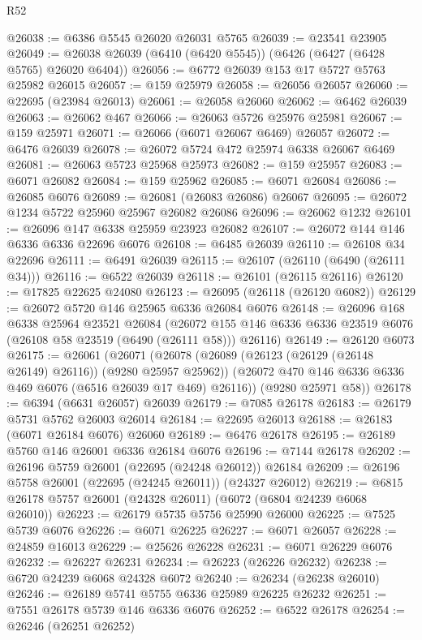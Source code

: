 \begin{lexlean}{R52}
\begin{coremodule}
@26038 := @6386 @5545 @26020 @26031 @5765
@26039 := @23541 @23905
@26049 := @26038 @26039 (@6410 (@6420 @5545)) (@6426 (@6427 (@6428 @5765) @26020 @6404))
@26056 := @6772 @26039 @153 @17 @5727 @5763 @25982 @26015
@26057 := @159 @25979
@26058 := @26056 @26057
@26060 := @22695 (@23984 @26013)
@26061 := @26058 @26060
@26062 := @6462 @26039
@26063 := @26062 @467
@26066 := @26063 @5726 @25976 @25981
@26067 := @159 @25971
@26071 := @26066 (@6071 @26067 @6469) @26057
@26072 := @6476 @26039
@26078 := @26072 @5724 @472 @25974 @6338 @26067 @6469
@26081 := @26063 @5723 @25968 @25973
@26082 := @159 @25957
@26083 := @6071 @26082
@26084 := @159 @25962
@26085 := @6071 @26084
@26086 := @26085 @6076
@26089 := @26081 (@26083 @26086) @26067
@26095 := @26072 @1234 @5722 @25960 @25967 @26082 @26086
@26096 := @26062 @1232
@26101 := @26096 @147 @6338 @25959 @23923 @26082
@26107 := @26072 @144 @146 @6336 @6336 @22696 @6076
@26108 := @6485 @26039
@26110 := @26108 @34 @22696
@26111 := @6491 @26039
@26115 := @26107 (@26110 (@6490 (@26111 @34)))
@26116 := @6522 @26039
@26118 := @26101 (@26115 @26116)
@26120 := @17825 @22625 @24080
@26123 := @26095 (@26118 (@26120 @6082))
@26129 := @26072 @5720 @146 @25965 @6336 @26084 @6076
@26148 := @26096
    @168
    @6338
    @25964
    @23521
    @26084
    (@26072 @155 @146 @6336 @6336 @23519 @6076 (@26108 @58 @23519 (@6490 (@26111 @58))) @26116)
@26149 := @26120 @6073
@26175 := @26061
    (@26071
      (@26078
        (@26089 (@26123 (@26129 (@26148 @26149) @26116)) (@9280 @25957 @25962))
        (@26072 @470 @146 @6336 @6336 @469 @6076 (@6516 @26039 @17 @469) @26116))
      (@9280 @25971 @58))
@26178 := @6394 (@6631 @26057) @26039
@26179 := @7085 @26178
@26183 := @26179 @5731 @5762 @26003 @26014
@26184 := @22695 @26013
@26188 := @26183 (@6071 @26184 @6076) @26060
@26189 := @6476 @26178
@26195 := @26189 @5760 @146 @26001 @6336 @26184 @6076
@26196 := @7144 @26178
@26202 := @26196 @5759 @26001 (@22695 (@24248 @26012)) @26184
@26209 := @26196 @5758 @26001 (@22695 (@24245 @26011)) (@24327 @26012)
@26219 := @6815 @26178 @5757 @26001 (@24328 @26011) (@6072 (@6804 @24239 @6068 @26010))
@26223 := @26179 @5735 @5756 @25990 @26000
@26225 := @7525 @5739 @6076
@26226 := @6071 @26225
@26227 := @6071 @26057
@26228 := @24859 @16013
@26229 := @25626 @26228
@26231 := @6071 @26229 @6076
@26232 := @26227 @26231
@26234 := @26223 (@26226 @26232)
@26238 := @6720 @24239 @6068 @24328 @6072
@26240 := @26234 (@26238 @26010)
@26246 := @26189 @5741 @5755 @6336 @25989 @26225 @26232
@26251 := @7551 @26178 @5739 @146 @6336 @6076
@26252 := @6522 @26178
@26254 := @26246 (@26251 @26252)

\end{coremodule}
\end{lexlean}
